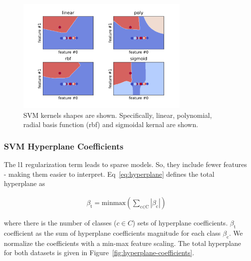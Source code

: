 \documentclass[runningheads]{llncs}
\begin{document}
\begin{figure}[htb]
  \centering
  \includegraphics[width=8.5cm]{kernels.png}
  \caption{
    SVM kernels shapes are shown.
    Specifically, linear, polynomial, radial basis function (rbf) and sigmoidal kernal are shown.}
  \label{fig:kernels}
\end{figure}

\subsubsection{SVM Hyperplane Coefficients}
\label{sec:background-svm-hyperplane}

The l1 regularization term leads to sparse models.
So, they include fewer features - making them easier to interpret.
Eq~\ref{eq:hyperplane} defines the total hyperplane as

\begin{align}\label{eq:hyperplane}
  \beta_{\text{t}} = \text{minmax}(
  \sum_{\text{c} \in \text{C}}
  |\beta_{\text{c}}|
  )
\end{align}

where there is the number of classes ($c \in C$) sets of hyperplane coefficients.
$\beta_{\text{t}}$ coefficient as the sum of hyperplane coefficients magnitude for each class $\beta_{\text{c}}$.
We normalize the coefficients with a min-max feature scaling.
The total hyperplane for both datasets is given in Figure~\ref{fig:hyperplane-coefficients}.
\end{document}
